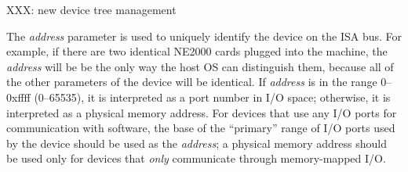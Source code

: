 
XXX: new device tree management

The \emph{address} parameter is used
to uniquely identify the device on the ISA bus.
For example, if there are two identical NE2000 cards plugged into the machine,
the \emph{address} will be be the only way the host OS can distinguish them,
because all of the other parameters of the device will be identical.
If \emph{address} is in the range 0--0xffff (0--65535),
it is interpreted as a port number in I/O space;
otherwise, it is interpreted as a physical memory address.
For devices that use any I/O ports for communication with software,
the base of the ``primary'' range of I/O ports used by the device
should be used as the \emph{address};
a physical memory address should be used
only for devices that \emph{only} communicate through memory-mapped I/O.

